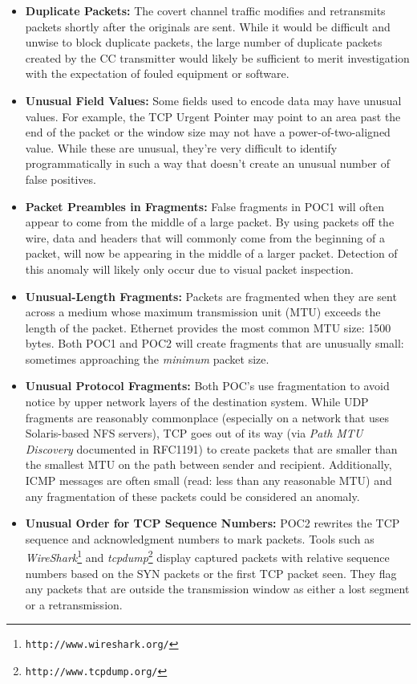 \documentclass[letterpaper,10pt,draft]{article}
\begin{document}
\begin{itemize}
\item \textbf{Duplicate Packets:} The covert channel traffic modifies and
retransmits packets shortly after the originals are sent.  While it
would be difficult and unwise to block duplicate packets, the large
number of duplicate packets created by the CC transmitter would likely
be sufficient to merit investigation with the expectation of fouled
equipment or software.

\item \textbf{Unusual Field Values:} Some fields used to encode data
may have unusual values.  For example, the TCP Urgent Pointer may
point to an area past the end of the packet or the window size may not
have a power-of-two-aligned value.  While these are unusual, they're
very difficult to identify programmatically in such a way that doesn't
create an unusual number of false positives.

\item \textbf{Packet Preambles in Fragments:} False fragments
in POC1 will often appear to come from the middle of a large packet.
By using packets off the wire, data and headers that will commonly
come from the beginning of a packet, will now be appearing in the
middle of a larger packet.  Detection of this anomaly will likely only
occur due to visual packet inspection.

\item \textbf{Unusual-Length Fragments:} Packets are fragmented when
they are sent across a medium whose maximum transmission unit (MTU)
exceeds the length of the packet.  Ethernet provides the most common
MTU size: 1500 bytes.  Both POC1 and POC2 will create fragments that
are unusually small: sometimes approaching the \textit{minimum} packet
size.

\item \textbf{Unusual Protocol Fragments:} Both POC's use
fragmentation to avoid notice by upper network layers of the
destination system. While UDP fragments are reasonably commonplace
(especially on a network that uses Solaris-based NFS servers), TCP
goes out of its way (via \textit{Path MTU Discovery} documented in
RFC1191) to create packets that are smaller than the smallest MTU on
the path between sender and recipient.  Additionally, ICMP messages
are often small (read: less than any reasonable MTU) and any
fragmentation of these packets could be considered an anomaly.

\item \textbf{Unusual Order for TCP Sequence Numbers:} POC2 rewrites
the TCP sequence and acknowledgment numbers to mark packets.  Tools
such as
\textit{WireShark}\footnote{\texttt{http://www.wireshark.org/}} and
\textit{tcpdump}\footnote{\texttt{http://www.tcpdump.org/}} display
captured packets with relative sequence numbers based on the SYN
packets or the first TCP packet seen.  They flag any packets that are
outside the transmission window as either a lost segment or a
retransmission.


\end{itemize}
\end{document}
